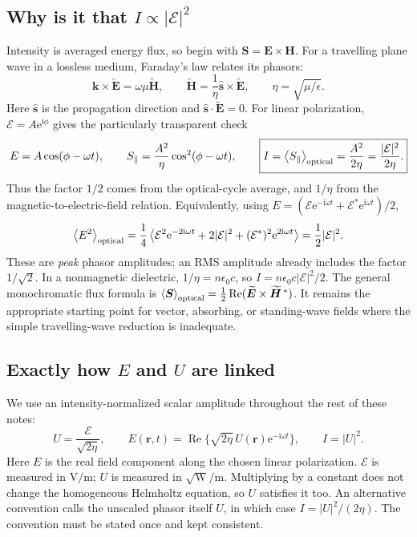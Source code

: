 \documentclass[11pt,a4paper]{article}
\numberwithin{equation}{section}
\newcommand{\ii}{\mathrm{i}}
\newcommand{\ee}{\mathrm{e}}
\newcommand{\vct}[1]{\bm{#1}}
\newcommand{\avg}[1]{\left\langle #1\right\rangle}
\newcommand{\Real}{\operatorname{Re}}
\begin{document}
\subsection{Why is it that \texorpdfstring{$I\propto|\mathcal E|^2$}{intensity proportional to field squared}}
Intensity is averaged energy flux, so begin with
$\vct S=\vct E\times\vct H$. For a travelling plane wave in a lossless
medium, Faraday's law relates its phasors:
\begin{equation}
\vct k\times\widetilde{\vct E}=\omega\mu\widetilde{\vct H},
\qquad
\widetilde{\vct H}=\frac{1}{\eta}\widehat{\vct s}\times\widetilde{\vct E},
\qquad \eta=\sqrt{\mu/\epsilon}.
\end{equation}
Here $\widehat{\vct s}$ is the propagation direction and
$\widehat{\vct s}\cdot\widetilde{\vct E}=0$. For linear polarization,
$\mathcal E=A\ee^{\ii\phi}$ gives the particularly transparent check
\begin{equation}
E=A\cos(\phi-\omega t),\qquad
S_{\parallel}=\frac{A^2}{\eta}\cos^2(\phi-\omega t),\qquad
\boxed{I=\avg{S_{\parallel}}_{\rm optical}
=\frac{A^2}{2\eta}=\frac{|\mathcal E|^2}{2\eta}.}
\label{eq:intensity}
\end{equation}
Thus the factor $1/2$ comes from the optical-cycle average, and $1/\eta$
from the magnetic-to-electric-field relation. Equivalently, using
$E=(\mathcal E\ee^{-\ii\omega t}+\mathcal E^*\ee^{\ii\omega t})/2$,
\[
\avg{E^2}_{\rm optical}
=\frac14\avg{\mathcal E^2\ee^{-2\ii\omega t}
+2|\mathcal E|^2+(\mathcal E^*)^2\ee^{2\ii\omega t}}
=\frac12|\mathcal E|^2.
\]
These are \emph{peak} phasor amplitudes; an RMS amplitude already includes
the factor $1/\sqrt2$. In a nonmagnetic dielectric,
$1/\eta=n\epsilon_0c$, so $I=n\epsilon_0c|\mathcal E|^2/2$.
The general monochromatic flux formula is
$\avg{\vct S}_{\rm optical}=\tfrac12\Real
(\widetilde{\vct E}\times\widetilde{\vct H}^{\,*})$.
It remains the appropriate starting point for vector, absorbing, or
standing-wave fields where the simple travelling-wave reduction is inadequate.

\subsection{Exactly how \texorpdfstring{$E$ and $U$}{E and U} are linked}
We use an intensity-normalized scalar amplitude throughout the rest of
these notes:
\begin{equation}
\boxed{U=\frac{\mathcal E}{\sqrt{2\eta}},\qquad
E(\vct r,t)=\Real\{\sqrt{2\eta}\,U(\vct r)\ee^{-\ii\omega t}\},
\qquad I=|U|^2.}
\label{eq:normalization}
\end{equation}
Here $E$ is the real field component along the chosen linear polarization.
$\mathcal E$ is measured in $\mathrm{V/m}$; $U$ is measured in
$\sqrt{\mathrm W}/\mathrm m$. Multiplying by a constant does not change
the homogeneous Helmholtz equation, so $U$ satisfies it too.
An alternative convention calls the unscaled phasor itself $U$, in which
case $I=|U|^2/(2\eta)$. The convention must be stated once and kept consistent.
\end{document}
